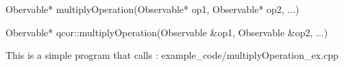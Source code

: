 
\begin{apidefinition}

\begin{Csynopsis}
    Obervable* multiplyOperation(Observable* op1, Observable* op2, ...)
\end{Csynopsis}

\begin{Cppsynopsis}
    Obervable* qcor::multiplyOperation(Observable &op1, Observable &op2, ...)
\end{Cppsynopsis}


\begin{apiarguments}
\end{apiarguments}



\apinotes{
    
}

\begin{apiexamples}

\apicppexample
    { This is a simple program that calls : } 
    { example_code/multiplyOperation_ex.cpp} 
    {}

\end{apiexamples}

\end{apidefinition}
